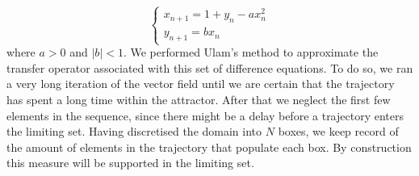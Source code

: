 \begin{equation}
\begin{cases}
x_{n+1}=1+y_n - ax_n ^2 \\
y_{n+1}=bx_n
\end{cases}
\end{equation}
where $a>0$ and $\vert b \vert <1 $. We performed Ulam's method to approximate the transfer operator associated with this set of difference equations. To do so, we ran a very long iteration of the vector field until we are certain that the trajectory has spent a long time within the attractor. After that we neglect the first few elements in the sequence, since there might be a delay before a trajectory enters the limiting set. Having discretised the domain into $N$ boxes, we keep record of the amount of elements in the trajectory that populate each box. By construction this measure will be supported in the limiting set.

